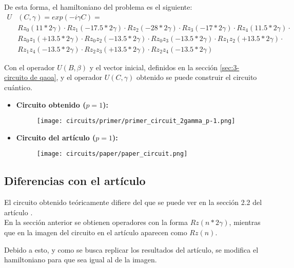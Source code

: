 \documentclass{article}
\begin{document}
\par
De esta forma, el hamiltoniano del problema es el siguiente:
\begin{align*}
  U&(C, \gamma) = exp(-i \gamma C) = &&\\
   &Rz_0(11*2\gamma) \cdot Rz_1(-17.5*2\gamma) \cdot Rz_2(-28*2\gamma) \cdot Rz_3(-17*2\gamma) \cdot Rz_4(11.5*2\gamma) \cdot \\
   &Rz_0z_1(+13.5 * 2\gamma) \cdot Rz_0z_2(-13.5 * 2\gamma) \cdot Rz_0z_3(-13.5 * 2\gamma) \cdot Rz_1z_2(+13.5 * 2\gamma) \cdot \\
   &Rz_1z_4(-13.5 * 2\gamma) \cdot Rz_2z_3(+13.5 * 2\gamma) \cdot Rz_2z_4(-13.5 * 2\gamma)
\end{align*}

Con el operador \(U(B, \beta)\) y el vector inicial, definidos en la sección \ref{sec:3-circuito de qaoa},  %
y el operador \(U(C, \gamma)\) obtenido se puede construir el circuito cuántico.

\begin{itemize}
\item \textbf{Circuito obtenido ($p=1$):}
  \begin{figure}[htbp]
    \centering
    \texttt{[image: circuits/primer/primer\_circuit\_2gamma\_p-1.png]}
  \end{figure}

\item \textbf{Circuito del artículo ($p=1$):}
  \begin{figure}[htbp]
    \centering
    \texttt{[image: circuits/paper/paper\_circuit.png]}
  \end{figure}
\end{itemize}

\subsection{Diferencias con el artículo}
El circuito obtenido teóricamente difiere del que se puede ver en la sección 2.2 del artículo \cite{multi-objective_routing_optimization}. \\
En la sección anterior se obtienen operadores con la forma \(Rz(n*2\gamma)\), mientras que en la imagen del circuito en el artículo aparecen como \(Rz(n)\).

Debido a esto, y como se busca replicar los resultados del artículo, se modifica el hamiltoniano para que sea igual al de la imagen.
\end{document}
